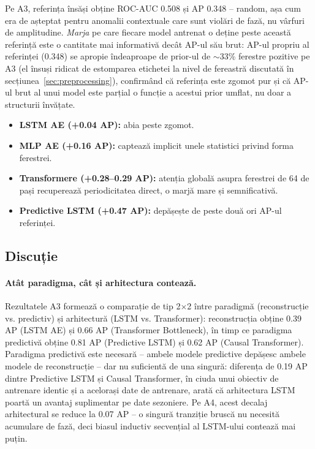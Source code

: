 Pe A3, referința însăși obține ROC-AUC 0.508 și AP 0.348 -- random, așa cum era de așteptat pentru anomalii contextuale care sunt violări de fază, nu vârfuri de amplitudine. \emph{Marja} pe care fiecare model antrenat o deține peste această referință este o cantitate mai informativă decât AP-ul său brut: AP-ul propriu al referinței (0.348) se apropie îndeaproape de prior-ul de $\sim$33\% ferestre pozitive pe A3 (el însuși ridicat de estomparea etichetei la nivel de fereastră discutată în secțiunea~\ref{sec:preprocessing}), confirmând că referința este zgomot pur și că AP-ul brut al unui model este parțial o funcție a acestui prior umflat, nu doar a structurii învățate.

\begin{itemize}
  \item \textbf{LSTM AE (+0.04 AP):} abia peste zgomot.
  \item \textbf{MLP AE (+0.16 AP):} captează implicit unele statistici privind forma ferestrei.
  \item \textbf{Transformere (+0.28--0.29 AP):} atenția globală asupra ferestrei de 64 de pași recuperează periodicitatea direct, o marjă mare și semnificativă.
  \item \textbf{Predictive LSTM (+0.47 AP):} depășește de peste două ori AP-ul referinței.
\end{itemize}

\subsection{Discuție}

\paragraph{Atât paradigma, cât și arhitectura contează.} Rezultatele A3 formează o comparație de tip 2$\times$2 între paradigmă (reconstrucție vs. predictiv) și arhitectură (LSTM vs. Transformer): reconstrucția obține 0.39 AP (LSTM AE) și 0.66 AP (Transformer Bottleneck), în timp ce paradigma predictivă obține 0.81 AP (Predictive LSTM) și 0.62 AP (Causal Transformer).
Paradigma predictivă este necesară -- ambele modele predictive depășesc ambele modele de reconstrucție -- dar nu suficientă de una singură: diferența de 0.19 AP dintre Predictive LSTM și Causal Transformer, în ciuda unui obiectiv de antrenare identic și a acelorași date de antrenare, arată că arhitectura LSTM poartă un avantaj suplimentar pe date sezoniere. Pe A4, acest decalaj arhitectural se reduce la 0.07 AP -- o singură tranziție bruscă nu necesită acumulare de fază, deci biasul inductiv secvențial al LSTM-ului contează mai puțin.

